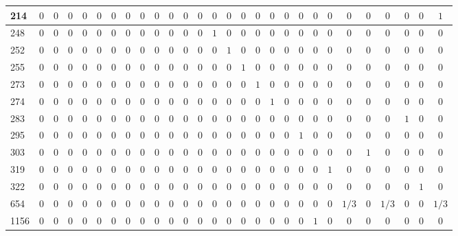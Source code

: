 \documentclass[a4paper,parskip=full]{scrartcl}
\begin{document}
\begin{table}[ht!]
{\begin{tabular}{| l | c | c | c | c | c | c | c | c | c | c | c | c | c | c | c | c | c | c | c | c | c | c | c | c | c | c | c |}
214 & $0$ & $0$ & $0$ & $0$ & $0$ & $0$ & $0$ & $0$ & $0$ & $0$ & $0$ & $0$ & $0$ & $0$ & $0$ & $0$ & $0$ & $0$ & $0$ & $0$ & $0$ & $0$ & $0$ & $0$ & $0$ & $0$ & $1$\\ \hline
248 & $0$ & $0$ & $0$ & $0$ & $0$ & $0$ & $0$ & $0$ & $0$ & $0$ & $0$ & $0$ & $1$ & $0$ & $0$ & $0$ & $0$ & $0$ & $0$ & $0$ & $0$ & $0$ & $0$ & $0$ & $0$ & $0$ & $0$\\ \hline
252 & $0$ & $0$ & $0$ & $0$ & $0$ & $0$ & $0$ & $0$ & $0$ & $0$ & $0$ & $0$ & $0$ & $1$ & $0$ & $0$ & $0$ & $0$ & $0$ & $0$ & $0$ & $0$ & $0$ & $0$ & $0$ & $0$ & $0$\\ \hline
255 & $0$ & $0$ & $0$ & $0$ & $0$ & $0$ & $0$ & $0$ & $0$ & $0$ & $0$ & $0$ & $0$ & $0$ & $1$ & $0$ & $0$ & $0$ & $0$ & $0$ & $0$ & $0$ & $0$ & $0$ & $0$ & $0$ & $0$\\ \hline
273 & $0$ & $0$ & $0$ & $0$ & $0$ & $0$ & $0$ & $0$ & $0$ & $0$ & $0$ & $0$ & $0$ & $0$ & $0$ & $1$ & $0$ & $0$ & $0$ & $0$ & $0$ & $0$ & $0$ & $0$ & $0$ & $0$ & $0$\\ \hline
274 & $0$ & $0$ & $0$ & $0$ & $0$ & $0$ & $0$ & $0$ & $0$ & $0$ & $0$ & $0$ & $0$ & $0$ & $0$ & $0$ & $1$ & $0$ & $0$ & $0$ & $0$ & $0$ & $0$ & $0$ & $0$ & $0$ & $0$\\ \hline
283 & $0$ & $0$ & $0$ & $0$ & $0$ & $0$ & $0$ & $0$ & $0$ & $0$ & $0$ & $0$ & $0$ & $0$ & $0$ & $0$ & $0$ & $0$ & $0$ & $0$ & $0$ & $0$ & $0$ & $0$ & $1$ & $0$ & $0$\\ \hline
295 & $0$ & $0$ & $0$ & $0$ & $0$ & $0$ & $0$ & $0$ & $0$ & $0$ & $0$ & $0$ & $0$ & $0$ & $0$ & $0$ & $0$ & $0$ & $1$ & $0$ & $0$ & $0$ & $0$ & $0$ & $0$ & $0$ & $0$\\ \hline
303 & $0$ & $0$ & $0$ & $0$ & $0$ & $0$ & $0$ & $0$ & $0$ & $0$ & $0$ & $0$ & $0$ & $0$ & $0$ & $0$ & $0$ & $0$ & $0$ & $0$ & $0$ & $0$ & $1$ & $0$ & $0$ & $0$ & $0$\\ \hline
319 & $0$ & $0$ & $0$ & $0$ & $0$ & $0$ & $0$ & $0$ & $0$ & $0$ & $0$ & $0$ & $0$ & $0$ & $0$ & $0$ & $0$ & $0$ & $0$ & $0$ & $1$ & $0$ & $0$ & $0$ & $0$ & $0$ & $0$\\ \hline
322 & $0$ & $0$ & $0$ & $0$ & $0$ & $0$ & $0$ & $0$ & $0$ & $0$ & $0$ & $0$ & $0$ & $0$ & $0$ & $0$ & $0$ & $0$ & $0$ & $0$ & $0$ & $0$ & $0$ & $0$ & $0$ & $1$ & $0$\\ \hline
654 & $0$ & $0$ & $0$ & $0$ & $0$ & $0$ & $0$ & $0$ & $0$ & $0$ & $0$ & $0$ & $0$ & $0$ & $0$ & $0$ & $0$ & $0$ & $0$ & $0$ & $0$ & $1/3$ & $0$ & $1/3$ & $0$ & $0$ & $1/3$\\ \hline
1156 & $0$ & $0$ & $0$ & $0$ & $0$ & $0$ & $0$ & $0$ & $0$ & $0$ & $0$ & $0$ & $0$ & $0$ & $0$ & $0$ & $0$ & $0$ & $0$ & $1$ & $0$ & $0$ & $0$ & $0$ & $0$ & $0$ & $0$\\ \hline

\end{tabular}}
\end{table}
\end{document}

